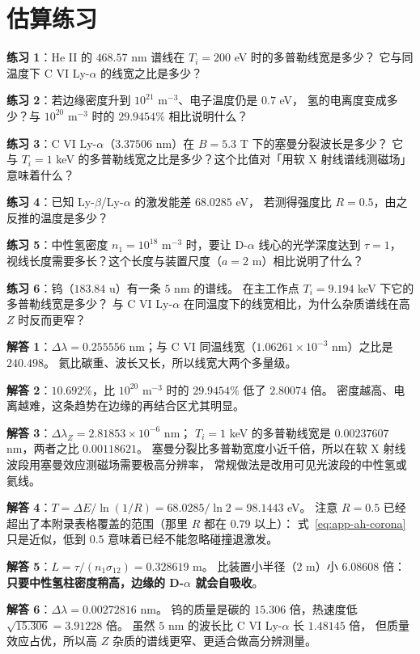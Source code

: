 \section{估算练习}
\label{sec:app-ah-problems}

\textbf{练习 1}：He II 的 $468.57$ nm 谱线在 $T_i=200$ eV 时的多普勒线宽是多少？
它与同温度下 C VI Ly-$\alpha$ 的线宽之比是多少？

\textbf{练习 2}：若边缘密度升到 $10^{21}$ m$^{-3}$、电子温度仍是 $0.7$ eV，
氢的电离度变成多少？与 $10^{20}$ m$^{-3}$ 时的 $29.9454\%$ 相比说明什么？

\textbf{练习 3}：C VI Ly-$\alpha$（$3.37506$ nm）在 $B=5.3$ T 下的塞曼分裂波长是多少？
它与 $T_i=1$ keV 的多普勒线宽之比是多少？这个比值对「用软 X 射线谱线测磁场」意味着什么？

\textbf{练习 4}：已知 Ly-$\beta$/Ly-$\alpha$ 的激发能差 $68.0285$ eV，
若测得强度比 $R=0.5$，由之反推的温度是多少？

\textbf{练习 5}：中性氢密度 $n_1=10^{18}$ m$^{-3}$ 时，要让 D-$\alpha$ 线心的光学深度达到 $\tau=1$，
视线长度需要多长？这个长度与装置尺度（$a=2$ m）相比说明了什么？

\textbf{练习 6}：钨（$183.84$ u）有一条 $5$ nm 的谱线。
在主工作点 $T_i=9.194$ keV 下它的多普勒线宽是多少？
与 C VI Ly-$\alpha$ 在同温度下的线宽相比，为什么杂质谱线在高 $Z$ 时反而更窄？

\textbf{解答 1}：$\Delta\lambda = 0.255556$ nm；与 C VI 同温线宽（$1.06261\times10^{-3}$ nm）之比是 $240.498$。
氦比碳重、波长又长，所以线宽大两个多量级。

\textbf{解答 2}：$10.692\%$，比 $10^{20}$ m$^{-3}$ 时的 $29.9454\%$ 低了 $2.80074$ 倍。
密度越高、电离越难，这条趋势在边缘的再结合区尤其明显。

\textbf{解答 3}：$\Delta\lambda_Z = 2.81853\times10^{-6}$ nm；
$T_i=1$ keV 的多普勒线宽是 $0.00237607$ nm，两者之比 $0.00118621$。
塞曼分裂比多普勒宽度小近千倍，所以在软 X 射线波段用塞曼效应测磁场需要极高分辨率，
常规做法是改用可见光波段的中性氢或氦线。

\textbf{解答 4}：$T = \Delta E/\ln(1/R) = 68.0285/\ln 2 = 98.1443$ eV。
注意 $R=0.5$ 已经超出了本附录表格覆盖的范围（那里 $R$ 都在 $0.79$ 以上）：
式~\eqref{eq:app-ah-corona} 只是近似，低到 $0.5$ 意味着已经不能忽略碰撞退激发。

\textbf{解答 5}：$L = \tau/(n_1\sigma_{12}) = 0.328619$ m。
比装置小半径（$2$ m）小 $6.08608$ 倍：\textbf{只要中性氢柱密度稍高，边缘的 D-$\alpha$ 就会自吸收}。

\textbf{解答 6}：$\Delta\lambda = 0.00272816$ nm。
钨的质量是碳的 $15.306$ 倍，热速度低 $\sqrt{15.306}=3.91228$ 倍。
虽然 $5$ nm 的波长比 C VI Ly-$\alpha$ 长 $1.48145$ 倍，
但质量效应占优，所以高 $Z$ 杂质的谱线更窄、更适合做高分辨测量。

